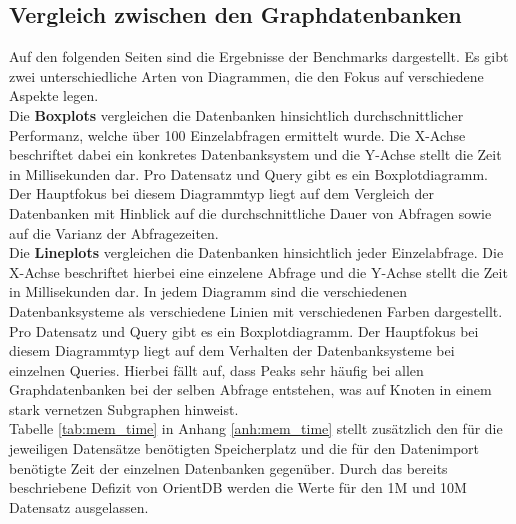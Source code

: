 \documentclass[11pt, a4paper, oneside]{article} %
\begin{document}
\begin{appendix}
\subsection{Vergleich zwischen den Graphdatenbanken}
Auf den folgenden Seiten sind die Ergebnisse der Benchmarks dargestellt. Es gibt zwei unterschiedliche Arten von Diagrammen, die den Fokus auf verschiedene Aspekte legen. \\
Die \textbf{Boxplots} vergleichen die Datenbanken hinsichtlich durchschnittlicher Performanz, welche über 100 Einzelabfragen ermittelt wurde. Die X-Achse beschriftet dabei ein konkretes Datenbanksystem und die Y-Achse stellt die Zeit in Millisekunden dar. Pro Datensatz und Query gibt es ein Boxplotdiagramm. Der Hauptfokus bei diesem Diagrammtyp liegt auf dem Vergleich der Datenbanken mit Hinblick auf die durchschnittliche Dauer von Abfragen sowie auf die Varianz der Abfragezeiten.\\
Die \textbf{Lineplots} vergleichen die Datenbanken hinsichtlich jeder Einzelabfrage. Die X-Achse beschriftet hierbei eine einzelene Abfrage und die Y-Achse stellt die Zeit in Millisekunden dar. In jedem Diagramm sind die verschiedenen Datenbanksysteme als verschiedene Linien mit verschiedenen Farben dargestellt. Pro Datensatz und Query gibt es ein Boxplotdiagramm. Der Hauptfokus bei diesem Diagrammtyp liegt auf dem Verhalten der Datenbanksysteme bei einzelnen Queries. Hierbei fällt auf, dass Peaks sehr häufig bei allen Graphdatenbanken bei der selben Abfrage entstehen, was auf Knoten in einem stark vernetzen Subgraphen hinweist.\\
Tabelle \ref{tab:mem_time} in Anhang \ref{anh:mem_time} stellt zusätzlich den für die jeweiligen Datensätze benötigten Speicherplatz und die für den Datenimport benötigte Zeit der einzelnen Datenbanken gegenüber. Durch das bereits beschriebene Defizit von OrientDB werden die Werte für den 1M und 10M Datensatz ausgelassen.

\begin{landscape} 
	\newpage
	\thispagestyle{empty}
	

\end{landscape}
\end{appendix}
\end{document}
